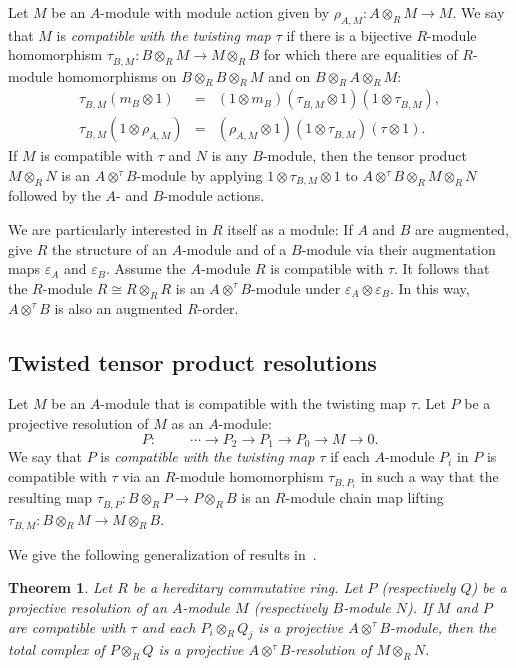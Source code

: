 \documentclass[11pt]{amsart}
\numberwithin{equation}{section}
\newtheorem{theorem}[equation]{Theorem}
\theoremstyle{definition}
\theoremstyle{remark}
\newcommand\ot{\otimes}
\newcommand{\ttp}{A\ot^{\tau}\! B}
\begin{document}
Let $M$ be an $A$-module with module action given by  
$\rho_{A,M}: A\ot_R M\rightarrow M$.
We say that $M$ is 
{\em compatible with the twisting map $\tau$} if there is a bijective
$R$-module homomorphism $\tau^{}_{B,M}: B\ot_R M\rightarrow M\ot_R B$ 
for which there are equalities of 
$R$-module homomorphisms on $B\ot_R B\ot_R M$ and on $B\ot_R A\ot_R M$: 
\begin{eqnarray*}
  \tau^{}_{B,M}(m_B\ot 1) & = & (1\ot  m_B)(\tau^{}_{B,M}\ot 1)(1\ot \tau^{}_{B,M}) ,\\
  \tau^{}_{B,M}(1\ot \rho^{}_{A,M})&  =&
  (\rho^{}_{A,M}\ot 1)(1\ot \tau^{}_{B,M})  (\tau \ot 1) . 
\end{eqnarray*}
If $M$ is compatible with $\tau$ and $N$ is any $B$-module,
then the tensor product $M\ot_R N$ is an $\ttp$-module by applying 
$1\ot\tau_{B,M}\ot 1$ to $\ttp\ot_R M\ot_R N$ followed by the 
$A$- and $B$-module actions.

We are particularly interested in $R$ itself as a module: 
If $A$ and $B$ are augmented, 
give $R$ the structure of an $A$-module and of a $B$-module via 
their augmentation maps $\varepsilon_A$ and $\varepsilon_B$.
Assume the $A$-module $R$ is compatible with $\tau$.
It follows that the $R$-module $R\cong R\ot_R R$
is an $\ttp$-module under $\varepsilon_A\ot \varepsilon_B$.
In this way, $\ttp$ is also an augmented $R$-order. 



\subsection*{Twisted tensor product resolutions}
Let $M$ be an $A$-module that is compatible with
the twisting map $\tau$. 
Let $P$ be a projective resolution of $M$ as an $A$-module:
\[
  P: \hspace{1cm} \cdots \longrightarrow P_2
     \longrightarrow P_1 \longrightarrow P_0 \longrightarrow M
     \longrightarrow 0 .
\]
We say that $P$ 
is {\em compatible with the twisting map $\tau$} if
each $A$-module $P_i$ in $P$ is compatible with $\tau$ 
via an $R$-module homomorphism $\tau^{}_{B,P_i}$
in such a way that the resulting map 
$\tau^{}_{B,P}: B\ot_R P\rightarrow P\ot_R B$ 
is an $R$-module chain map lifting
$\tau^{}_{B,M}: B\ot_R M \rightarrow M\ot_R B$.


We give the following generalization of results  
in~\cite[Section 5]{Shepler-W}.


\begin{theorem}\label{thm:ttpr}
Let $R$ be a hereditary commutative ring.
Let $P$ (respectively $Q$) be a projective resolution of 
an $A$-module $M$ (respectively $B$-module $N$).
If $M$ and $P$ are compatible with $\tau$
and each $P_i\ot_R Q_j$ is a projective $\ttp$-module, 
then the total complex of $P\ot_R\! Q$ is a projective
$\ttp$-resolution of $M\ot_R N$.
\end{theorem}
\end{document}
